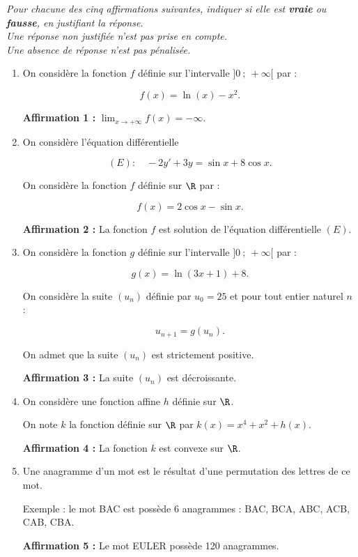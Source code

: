 \emph{Pour chacune des cinq affirmations suivantes, indiquer si elle est \textbf{vraie} ou \textbf{fausse}, en justifiant la réponse.\\
Une réponse non justifiée n’est pas prise en compte.\\
Une absence de réponse n’est pas pénalisée.}

\medskip

\begin{enumerate}
\item On considère la fonction $f$ définie sur l’intervalle $]0~;~ +\infty[$ par :

\[f(x) = \ln (x) - x^2.\]

\textbf{Affirmation 1 :} $\displaystyle \lim_{x \to +\infty} f(x) = -\infty$.

\item On considère l’équation différentielle 

\[(E) : \quad - 2y' + 3y = \sin x + 8\cos x.\]

On considère la fonction $f$ définie sur $\R$ par :

\[f(x) = 2\cos x - \sin x.\]

\textbf{Affirmation 2 :} La fonction $f$ est solution de l’équation différentielle $(E)$.

\item On considère la fonction $g$ définie sur l’intervalle $]0~;~+\infty[$ par :

\[g(x) = \ln (3x + 1) + 8.\]

On considère la suite $(u_n)$ définie par $u_0 = 25$ et pour tout entier naturel $n$ :

\[u_{n+1} = g(u_n).\]

On admet que la suite $(u_n)$ est strictement positive.

\textbf{Affirmation 3 :} La suite $(u_n)$ est décroissante.

\item On considère une fonction affine $h$ définie sur $\R$.

On note $k$ la fonction définie sur $\R$ par $k(x) = x^4 + x^2 + h(x)$.

\textbf{Affirmation 4 :} La fonction $k$ est convexe sur $\R$.

\item Une anagramme d'un mot est le résultat d'une permutation des lettres de ce mot.

Exemple : le mot BAC est possède 6 anagrammes : BAC, BCA, ABC, ACB, CAB, CBA.

\textbf{Affirmation 5 :} Le mot EULER possède 120 anagrammes.
\end{enumerate}

